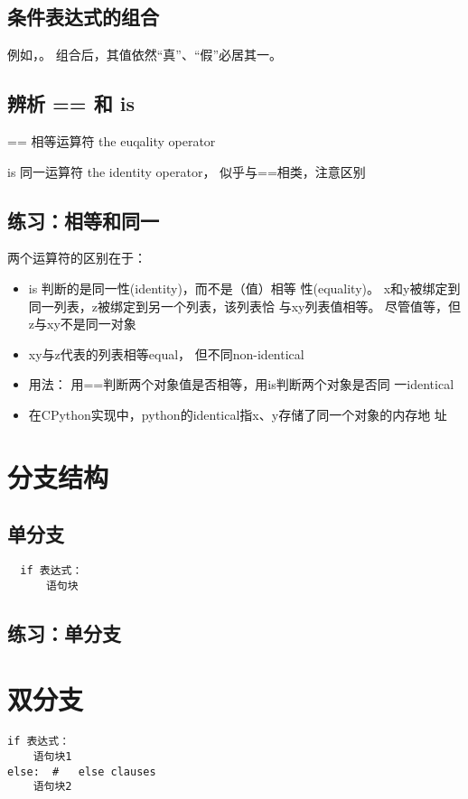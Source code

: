 \subsection{条件表达式的组合}
例如，。 组合后，其值依然“真”、“假”必居其一。
\subsection{辨析 == 和 is}
\begin{description}
\item{==} 相等运算符 the euqality operator
\item{is} 同一运算符 the identity operator， 似乎与==相类，注意区别
\end{description}
\subsection{练习：相等和同一}
两个运算符的区别在于：
\begin{itemize}
\item is 判断的是同一性(identity)，而不是（值）相等
  性(equality)。 x和y被绑定到同一列表，z被绑定到另一个列表，该列表恰
  与xy列表值相等。 尽管值等，但z与xy不是同一对象
\item xy与z代表的列表相等equal， 但不同non-identical
\item 用法： 用==判断两个对象值是否相等，用is判断两个对象是否同
  一identical
\item 在CPython实现中，python的identical指x、y存储了同一个对象的内存地
  址
\end{itemize}
\section{分支结构}
\subsection{单分支}
\begin{framed}
\begin{verbatim}
  if 表达式：
      语句块
\end{verbatim}
\end{framed}
\subsection{练习：单分支}
\section{双分支}
\begin{framed}
\begin{verbatim}
if 表达式：
    语句块1
else:  #   else clauses
    语句块2
\end{verbatim}
\end{framed}
